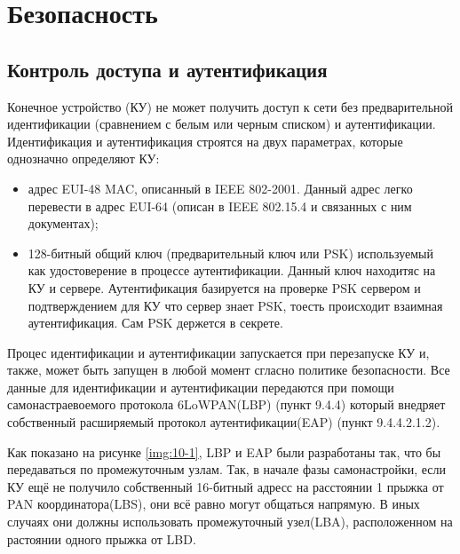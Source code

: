 \section{Безопасность}
\subsection{Контроль доступа и аутентификация}

Конечное устройство (КУ) не может получить доступ к сети без предварительной идентификации (сравнением с белым или черным списком) и аутентификации. Идентификация и аутентификация строятся на двух параметрах, которые однозначно определяют КУ:

\begin{itemize}
 \item адрес EUI-48 MAC, описанный в IEEE 802-2001. Данный адрес легко перевести в адрес EUI-64 (описан в IEEE 802.15.4 и связанных с ним документах);
 \item 128-битный общий ключ (предварительный ключ или PSK) используемый как удостоверение в процессе аутентификации. Данный ключ находитяс на КУ и сервере. Аутентификация базируется на проверке PSK сервером и подтверждением для КУ что сервер знает PSK, тоесть происходит взаимная аутентификация. Сам PSK держется в секрете.
\end{itemize}

Процес идентификации и аутентификации запускается при перезапуске КУ и, также, может быть запущен в любой момент сгласно политике безопасности. Все данные для идентификации и аутентификации передаются при помощи самонастраевоемого протокола 6LoWPAN(LBP) (пункт 9.4.4) который внедряет собственный расширяемый протокол аутентификации(EAP) (пункт 9.4.4.2.1.2).

Как показано на рисунке \ref{img:10-1}, LBP и EAP были разработаны так, что бы передаваться по промежуточным узлам. Так, в начале фазы самонастройки, если КУ ещё не получило собственный 16-битный адресс на расстоянии 1 прыжка от PAN координатора(LBS), они всё равно могут общаться напрямую. В иных случаях они должны использовать промежуточный узел(LBA), расположенном на растоянии одного прыжка от LBD.

